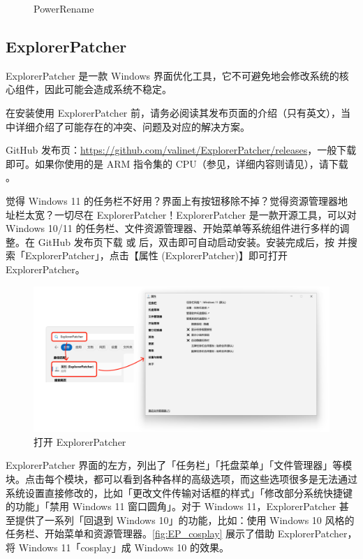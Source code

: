 \begin{itemize}
\begin{figure}[htb!]
      \caption{PowerRename}
      \label{fig:PowerRename}
    \end{figure}
\end{itemize}

\subsection{ExplorerPatcher}

\begin{dangerbox}
  ExplorerPatcher 是一款 Windows 界面优化工具，它不可避免地会修改系统的核心组件，因此可能会造成系统不稳定。

  在安装使用 ExplorerPatcher 前，请务必阅读其发布页面的介绍（只有英文），当中详细介绍了可能存在的冲突、问题及对应的解决方案。
\end{dangerbox}

GitHub 发布页：\url{https://github.com/valinet/ExplorerPatcher/releases}，一般下载  即可。如果你使用的是 ARM 指令集的 CPU（参见，详细内容则请见），请下载 。

觉得 Windows 11 的任务栏不好用？界面上有按钮移除不掉？觉得资源管理器地址栏太宽？一切尽在 ExplorerPatcher！ExplorerPatcher 是一款开源工具，可以对 Windows 10/11 的任务栏、文件资源管理器、开始菜单等系统组件进行多样的调整。在 GitHub 发布页下载  或  后，双击即可自动启动安装。安装完成后，按  并搜索「ExplorerPatcher」，点击【属性 (ExplorerPatcher)】即可打开 ExplorerPatcher。

\begin{figure}[htb!]
  \centering
  \includegraphics[width=.75\textwidth]{assets/software/EP_open.png}
  \caption{打开 ExplorerPatcher}
  \label{fig:EP_open}
\end{figure}

ExplorerPatcher 界面的左方，列出了「任务栏」「托盘菜单」「文件管理器」等模块。点击每个模块，都可以看到各种各样的高级选项，而这些选项很多是无法通过系统设置直接修改的，比如「更改文件传输对话框的样式」「修改部分系统快捷键的功能」「禁用 Windows 11 窗口圆角」。对于 Windows 11，ExplorerPatcher 甚至提供了一系列「回退到 Windows 10」的功能，比如：使用 Windows 10 风格的任务栏、开始菜单和资源管理器。\autoref{fig:EP_cosplay} 展示了借助 ExplorerPatcher，将 Windows 11「cosplay」成 Windows 10 的效果。

